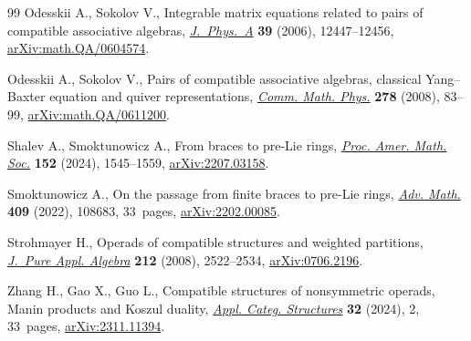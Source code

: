 \documentclass[pdftex]{sigma}
\numberwithin{equation}{section}
\begin{document}
\begin{thebibliography}{99}
Odesskii A., Sokolov V., Integrable matrix equations related to pairs of
 compatible associative algebras, \href{https://doi.org/10.1088/0305-4470/39/40/011}{\textit{J.~Phys.~A}} \textbf{39} (2006),
 12447--12456, \href{https://arxiv.org/abs/math.QA/0604574}{arXiv:math.QA/0604574}.

Odesskii A., Sokolov V., Pairs of compatible associative algebras, classical
 {Y}ang--{B}axter equation and quiver representations, \href{https://doi.org/10.1007/s00220-007-0361-9}{\textit{Comm. Math.
 Phys.}} \textbf{278} (2008), 83--99, \href{https://arxiv.org/abs/math.QA/0611200}{arXiv:math.QA/0611200}.

Shalev A., Smoktunowicz A., From braces to pre-{L}ie rings, \href{https://doi.org/10.1090/proc/16693}{\textit{Proc. Amer.
 Math. Soc.}} \textbf{152} (2024), 1545--1559, \href{https://arxiv.org/abs/2207.03158}{arXiv:2207.03158}.

Smoktunowicz A., On the passage from finite braces to pre-{L}ie rings,
 \href{https://doi.org/10.1016/j.aim.2022.108683}{\textit{Adv. Math.}} \textbf{409} (2022), 108683, 33~pages,
 \href{https://arxiv.org/abs/2202.00085}{arXiv:2202.00085}.

Strohmayer H., Operads of compatible structures and weighted partitions,
 \href{https://doi.org/10.1016/j.jpaa.2008.04.009}{\textit{J.~Pure Appl. Algebra}} \textbf{212} (2008), 2522--2534,
 \href{https://arxiv.org/abs/0706.2196}{arXiv:0706.2196}.

Zhang H., Gao X., Guo L., Compatible structures of nonsymmetric operads,
 {M}anin products and {K}oszul duality, \href{https://doi.org/10.1007/s10485-023-09760-x}{\textit{Appl. Categ. Structures}}
 \textbf{32} (2024), 2, 33~pages, \href{https://arxiv.org/abs/2311.11394}{arXiv:2311.11394}.

\end{thebibliography}\LastPageEnding
\end{document}
